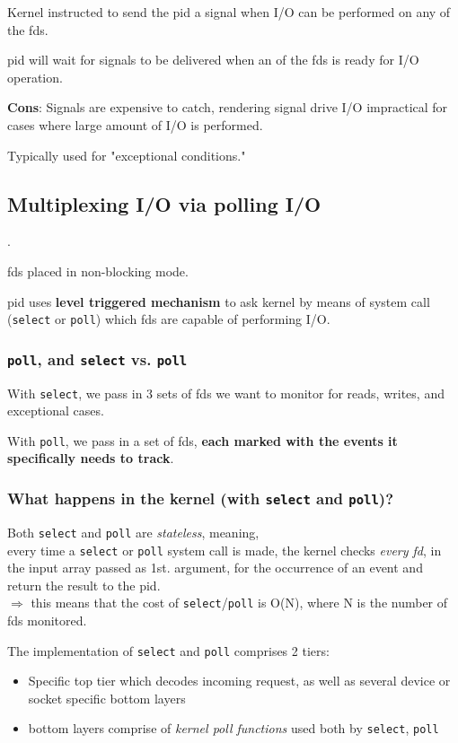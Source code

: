 \documentclass[10pt]{amsart}
\begin{document}
\begin{multicols*}{2}
Kernel instructed to send the pid a signal when I/O can be performed on any of the fds.

pid will wait for signals to be delivered when an of the fds is ready for I/O operation.

\textbf{Cons}: Signals are expensive to catch, rendering signal drive I/O impractical for cases where large amount of I/O is performed.

Typically used for "exceptional conditions."

\subsection{Multiplexing I/O via polling I/O}.

fds placed in non-blocking mode.

pid uses \textbf{level triggered mechanism} to ask kernel by means of system call (\texttt{select} or \texttt{poll}) which fds are capable of performing I/O. 

\subsubsection{\texttt{poll}, and \texttt{select} vs. \texttt{poll} }

With \texttt{select}, we pass in 3 sets of fds we want to monitor for reads, writes, and exceptional cases.

With \texttt{poll}, we pass in a set of fds, \textbf{each marked with the events it specifically needs to track}.

\subsubsection{What happens in the kernel (with \texttt{select} and \texttt{poll})?}

Both \texttt{select} and \texttt{poll} are \emph{stateless}, meaning, \\
every time a \texttt{select} or \texttt{poll} system call is made, the kernel checks \emph{every fd}, in the input array passed as 1st. argument, for the occurrence of an event and return the result to the pid. \\
$\Longrightarrow$ this means that the cost of \texttt{select}/\texttt{poll} is O(N), where N is the number of fds monitored.

The implementation of \texttt{select} and \texttt{poll} comprises 2 tiers:
\begin{itemize}
	\item Specific top tier which decodes incoming request, as well as several device or socket specific bottom layers
	\item bottom layers comprise of \emph{kernel poll functions} used both by \texttt{select}, \texttt{poll}
\end{itemize}


\end{multicols*}
\end{document}
